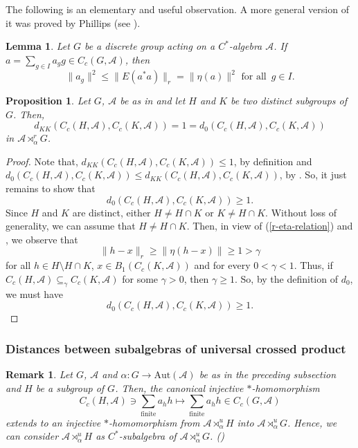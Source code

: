 \documentclass{amsart}
\numberwithin{equation}{section}
\newcommand{\1}{\mathbf{1}}
\newcommand{\mA}{\mathcal{A}}
\newtheorem{lemma}[theorem]{Lemma}
\newtheorem{proposition}[theorem]{Proposition}
\newtheorem{remark}[theorem]{Remark}
\begin{document}
The following is an elementary and useful observation. A more general
version of it was proved by Phillips (see \cite[Proposition 9.16(3)]{N}).
\begin{lemma}\label{ag-inequality}
Let $G$ be a discrete group acting on a $C^*$-algebra $\mA$. If $a=\sum_{g \in I}
a_{g}g\in C_c(G, \mA)$, then
\[
\|a_g\|^2\leq \|E(a^*a)\|_r=\|\eta(a)\|^2 \text{ for all }\,g\in I.
\]
\end{lemma}


\begin{proposition}\label{Cc-HA-Cc-KA-distance}\label{d0-distance}
Let $G$, $\mA$ be as in  and let  $H$ and $K$ be two
distinct subgroups of $G$. Then,
  \[
  d_{KK}(C_c(H, \mA),C_c(K, \mA))=1 = d_0(C_c(H, \mA),C_c(K, \mA))
  \]
in $\mA \rtimes^r_{\alpha} G$.
\end{proposition}
\begin{proof}
Note that, $d_{KK}(C_c(H, \mA),C_c(K, \mA))\leq 1$, by definition and
$d_{0}(C_c(H, \mA), C_c(K, \mA)) \leq d_{KK}(C_c(H, \mA),C_c(K,
\mA))$, by . So, it just remains  to show that
\[ d_{0}(C_c(H, \mA),C_c(K, \mA)) \geq 1.
\]
Since $H$ and $K$ are distinct, either $H \neq H \cap K$
or $K \neq H \cap K$.  Without loss of generality, we can assume that
$H\neq H\cap K$. Then, in view of
(\ref{r-eta-relation}) and , we observe that
\[
\| h - x\|_r \geq \|\eta(h - x)\| \geq 1 >\gamma
\]
for all
$h \in H \setminus H \cap K$,  $x \in B_1(C_c(K,
\mA))$ and for every $ 0 < \gamma < 1$. Thus,
  if $C_c(H, \mA) \subseteq_{\gamma} C_c(K, \mA)$ for some $\gamma >
  0$, then $\gamma \geq 1$. So, by the definition of $d_0$, we must have
  \[
  d_{0}(C_c(H, \mA), C_c(K, \mA)) \geq 1.
  \]
\end{proof}

\subsubsection{Distances between subalgebras of universal crossed product}
 
\begin{remark}
Let $G$, $\mA$ and $\alpha: G\rightarrow \mathrm{Aut}(\mA)$ be as in the
preceding subsection and $H$ be a subgroup of $G$. Then, the canonical
injective $*$-homomorphism
\[
C_c(H, \mA) \ni \sum_{\mathrm{finite}} a_h h \mapsto \sum_{\mathrm{finite}} a_h h\in C_c(G, \mA)
\]
 extends to an injective $*$-homomorphism from $\mA \rtimes^u_{\alpha} H
 $ into $\mA \rtimes^u_{\alpha} G$. Hence, we can consider
 $\mA \rtimes^u_{\alpha} H$ as $C^*$-subalgebra of
 $\mA \rtimes^u_{\alpha}G$. (\cite[Proposition 3.1]{MK})
 \end{remark}
\end{document}
